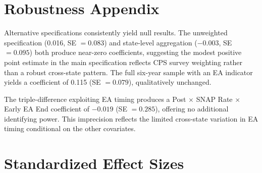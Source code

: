 \documentclass[12pt]{article}
\begin{document}
\section{Robustness Appendix}
\label{app:robust}

Alternative specifications consistently yield null results. The unweighted specification (0.016, SE $= 0.083$) and state-level aggregation ($-0.003$, SE $= 0.095$) both produce near-zero coefficients, suggesting the modest positive point estimate in the main specification reflects CPS survey weighting rather than a robust cross-state pattern. The full six-year sample with an EA indicator yields a coefficient of 0.115 (SE $= 0.079$), qualitatively unchanged.

The triple-difference exploiting EA timing produces a Post $\times$ SNAP Rate $\times$ Early EA End coefficient of $-0.019$ (SE $= 0.285$), offering no additional identifying power. This imprecision reflects the limited cross-state variation in EA timing conditional on the other covariates.

\section{Standardized Effect Sizes}
\label{sec:sde}


\end{document}
